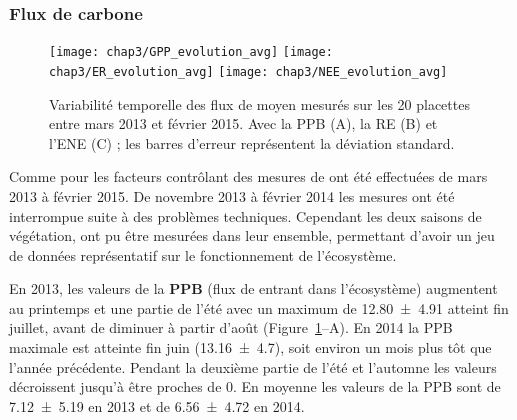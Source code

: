 


\subsubsection{Flux de carbone}

\begin{figure}
	\centering
	\texttt{[image: chap3/GPP\_evolution\_avg]}
	\texttt{[image: chap3/ER\_evolution\_avg]}
	\texttt{[image: chap3/NEE\_evolution\_avg]}
\caption{Variabilité temporelle des flux de \coo moyen mesurés sur les 20 placettes entre mars 2013 et février 2015. Avec la PPB (A), la RE (B) et l'ENE (C) ; les barres d'erreur représentent la déviation standard.}
\label{fig:flux_evolution_avg}
\end{figure}

Comme pour les facteurs contrôlant des mesures de \coo ont été effectuées de mars 2013 à février 2015.
De novembre 2013 à février 2014 les mesures ont été interrompue suite à des problèmes techniques.
Cependant les deux saisons de végétation, ont pu être mesurées dans leur ensemble, permettant d'avoir un jeu de données représentatif sur le fonctionnement de l'écosystème.

En 2013, les valeurs de la \textbf{PPB} (flux de \coo entrant dans l'écosystème) augmentent au printemps et une partie de l'été avec un maximum de \SI{12.80(491)}{\uml} atteint fin juillet, avant de diminuer à partir d'août (Figure~\ref{fig:flux_evolution_avg}--A).
En 2014 la PPB maximale est atteinte fin juin (\SI{13.16(470)}{\uml}), soit environ un mois plus tôt que l'année précédente.
Pendant la deuxième partie de l'été et l'automne les valeurs décroissent jusqu'à être proches de 0.
En moyenne les valeurs de la PPB sont de \SI{7.12(519)}{\uml} en 2013 et de \SI{6.56(472)}{\uml} en 2014.


